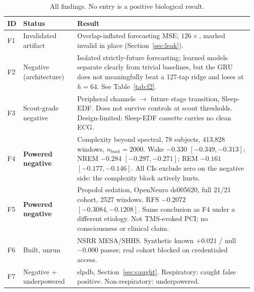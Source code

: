 \documentclass[11pt]{article}
\begin{document}
\begin{table}[h]
\centering
\footnotesize
\caption{All findings. No entry is a positive biological result.}
\begin{tabular}{@{}llp{6.6cm}@{}}
\toprule
ID & Status & Result \\
\midrule
F1 & Invalidated artifact &
Overlap-inflated forecasting MSE; $126\times$, marked invalid in place
(Section~\ref{sec:leak}). \\
\addlinespace
F2 & Negative (architecture) &
Isolated strictly-future forecasting; learned models separate clearly from
trivial baselines, but the GRU does not meaningfully beat a 127-tap ridge and
loses at $h=64$. See Table~\ref{tab:f2}. \\
\addlinespace
F3 & Scout-grade negative &
Peripheral channels $\to$ future stage transition, Sleep-EDF. Does not survive
controls at scout thresholds. Design-limited: Sleep-EDF cassette carries no clean
ECG. \\
\addlinespace
F4 & \textbf{Powered negative} &
Complexity beyond spectral, 78 subjects, 413{,}828 windows, $n_{\text{boot}}=2000$.
Wake $-0.330$ $[-0.349,-0.313]$; NREM $-0.284$ $[-0.297,-0.271]$;
REM $-0.161$ $[-0.177,-0.146]$. All CIs exclude zero on the negative side: the
complexity block actively hurts. \\
\addlinespace
F5 & \textbf{Powered negative} &
Propofol sedation, OpenNeuro ds005620, full 21/21 cohort, 2527 windows.
RFS $-0.2072$ $[-0.3084,-0.1208]$. Same conclusion as F4 under a different
etiology. Not TMS-evoked PCI; no consciousness or clinical claim. \\
\addlinespace
F6 & Built, unrun &
NSRR MESA/SHHS. Synthetic known $+0.021$ / null $-0.000$ passes; real cohort
blocked on credentialed access. \\
\addlinespace
F7 & Negative $+$ underpowered &
slpdb, Section~\ref{sec:caught}. Respiratory: caught false positive.
Non-respiratory: underpowered. \\
\bottomrule
\end{tabular}
\end{table}
\end{document}

